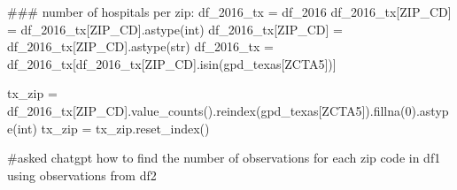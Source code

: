 \documentclass[
  letterpaper,
  DIV=11,
  numbers=noendperiod]{scrartcl}
\newenvironment{Shaded}{\begin{snugshade}}{\end{snugshade}}
\newcommand{\BuiltInTok}[1]{\textcolor[rgb]{0.00,0.23,0.31}{#1}}
\newcommand{\CommentTok}[1]{\textcolor[rgb]{0.37,0.37,0.37}{#1}}
\newcommand{\DecValTok}[1]{\textcolor[rgb]{0.68,0.00,0.00}{#1}}
\newcommand{\NormalTok}[1]{\textcolor[rgb]{0.00,0.23,0.31}{#1}}
\newcommand{\OperatorTok}[1]{\textcolor[rgb]{0.37,0.37,0.37}{#1}}
\newcommand{\StringTok}[1]{\textcolor[rgb]{0.13,0.47,0.30}{#1}}
\begin{document}
\begin{Shaded}
\begin{Highlighting}[]
\CommentTok{\#\#\# number of hospitals per zip:}
\NormalTok{df\_2016\_tx }\OperatorTok{=}\NormalTok{ df\_2016}
\NormalTok{df\_2016\_tx[}\StringTok{\textquotesingle{}ZIP\_CD\textquotesingle{}}\NormalTok{] }\OperatorTok{=}\NormalTok{ df\_2016\_tx[}\StringTok{\textquotesingle{}ZIP\_CD\textquotesingle{}}\NormalTok{].astype(}\BuiltInTok{int}\NormalTok{)}
\NormalTok{df\_2016\_tx[}\StringTok{\textquotesingle{}ZIP\_CD\textquotesingle{}}\NormalTok{] }\OperatorTok{=}\NormalTok{ df\_2016\_tx[}\StringTok{\textquotesingle{}ZIP\_CD\textquotesingle{}}\NormalTok{].astype(}\BuiltInTok{str}\NormalTok{)}
\NormalTok{df\_2016\_tx }\OperatorTok{=}\NormalTok{ df\_2016\_tx[df\_2016\_tx[}\StringTok{\textquotesingle{}ZIP\_CD\textquotesingle{}}\NormalTok{].isin(gpd\_texas[}\StringTok{\textquotesingle{}ZCTA5\textquotesingle{}}\NormalTok{])]}

\NormalTok{tx\_zip }\OperatorTok{=}\NormalTok{ df\_2016\_tx[}\StringTok{\textquotesingle{}ZIP\_CD\textquotesingle{}}\NormalTok{].value\_counts().reindex(gpd\_texas[}\StringTok{\textquotesingle{}ZCTA5\textquotesingle{}}\NormalTok{]).fillna(}\DecValTok{0}\NormalTok{).astype(}\BuiltInTok{int}\NormalTok{)}
\NormalTok{tx\_zip }\OperatorTok{=}\NormalTok{ tx\_zip.reset\_index()}

\CommentTok{\#asked chatgpt how to find the number of observations for each zip code in df1 using observations from df2}
\end{Highlighting}
\end{Shaded}
\end{document}
